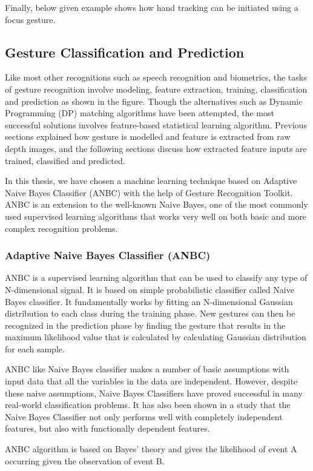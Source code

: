 Finally, below given example shows how hand tracking can be initiated using a focus gesture.

\subsection{Gesture Classification and Prediction}
Like most other recognitions such as speech recognition and biometrics, the tasks of gesture recognition involve modeling, feature extraction, training, classification and prediction as shown in the figure. Though the alternatives such as Dynamic Programming (DP) matching algorithms have been attempted, the most successful solutions involves feature-based statistical learning algorithm. Previous sections explained how gesture is modelled and feature is extracted from raw depth images, and the following sections discuss how extracted feature inputs are trained, classified and predicted.

In this thesis, we have chosen a machine learning technique based on Adaptive Naive Bayes Classifier (ANBC) with the help of Gesture Recognition Toolkit. ANBC is an extension to the well-known Naive Bayes, one of the most commonly used supervised learning algorithms that works very well on both basic and more complex recognition problems.

\subsubsection{Adaptive Naive Bayes Classifier (ANBC)}
ANBC is a supervised learning algorithm that can be used to classify any type of N-dimensional signal. It is based on simple probabilistic classifier called Naive Bayes classifier. It fundamentally works by fitting an N-dimensional Gaussian distribution to each class during the training phase. New gestures can then be recognized in the prediction phase by finding the gesture that results in the maximum likelihood value that is calculated by calculating Gaussian distribution for each sample. 

ANBC like Naive Bayes classifier makes a number of basic assumptions with input data that all the variables in the data are independent. However, despite these naive assumptions, Naive Bayes Classifiers have proved successful in many real-world classification problems. It has also been shown in a study that the Naive Bayes Classifier not only performs well with completely independent features, but also with functionally dependent features.

ANBC algorithm is based on Bayes' theory and gives the likelihood of event A occurring given the observation of event B.

